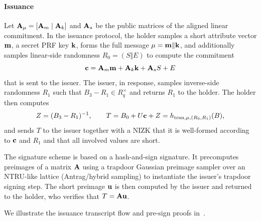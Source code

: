 \paragraph*{Issuance}
Let \(\mathbf{A}_\mu=[\mathbf{A}_m\mid \mathbf{A}_k]\) and \(\mathbf{A}_s\) be the public matrices of the aligned linear commitment. In
the issuance protocol, the holder samples a short attribute vector \(\mathbf{m}\), a secret PRF key \(\mathbf{k}\), forms the
full message \(\mathbf{\mu}=\mathbf{m}\Vert \mathbf{k}\), and additionally samples linear-side randomness \(R_0=(S\Vert E)\) to
compute the commitment
\[
\mathbf{c}=\mathbf{A}_m\mathbf{m}+\mathbf{A}_k\mathbf{k}+\mathbf{A}_sS+E
\]
that is sent to the issuer. The issuer, in response, samples inverse-side randomness \(R_1\) such that
\(B_3-R_1\in R_q^\times\) and returns \(R_1\) to the holder. The holder then computes
\[
Z=(B_3-R_1)^{-1},
\qquad
T = B_0 + U\mathbf{c} + Z = h_{\mathrm{tran},\mathbf{\mu},(R_0,R_1)}(B),
\]
and sends \(T\) to the issuer together with a NIZK that it is well-formed according to \(\mathbf{c}\) and \(R_1\)
and that all involved values are short.

The signature scheme is based on a hash-and-sign signature. It precomputes preimages of a matrix \(\mathbf{A}\) using
a trapdoor Gaussian preimage sampler over an NTRU-like lattice (Antrag/hybrid sampling) to instantiate the issuer’s
trapdoor signing step. The short preimage \(\mathbf{u}\) is then computed by the issuer and returned to the holder, who
verifies that \(T = \mathbf{A} \mathbf{u}\).

We illustrate the issuance transcript flow and pre-sign proofs in~.

